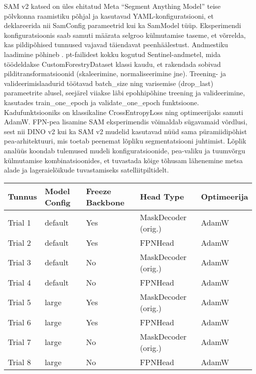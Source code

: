 SAM v2 katsed on üles ehitatud Meta ``Segment Anything Model'' teise põlvkonna
raamistiku põhjal ja kasutavad YAML-konfiguratsiooni, et deklareerida nii
SamConfig parameetrid kui ka SamModel tüüp. Eksperimendi konfiguratsioonis saab
samuti määrata selgroo külmutamise taseme, et võrrelda, kas pildipõhised
tunnused vajavad täiendavat peenhäälestust. Andmestiku laadimine põhineb .
pt-failidest kokku kogutud Sentinel-andmetel, mida töödeldakse
CustomForestryDataset klassi kaudu, et rakendada sobivad pilditransformatsioonid
(skaleerimine, normaliseerimine jne). Treening- ja valideerimislaadurid töötavad
batch\_size ning varisemise (drop\_last) parameetrite alusel, seejärel viiakse
läbi epohhipõhine treening ja valideerimine, kasutades train\_one\_epoch ja
validate\_one\_epoch funktsioone. Kadufunktsiooniks on klassikaline
CrossEntropyLoss ning optimeerijaks samuti AdamW. FPN-pea lisamine SAM
eksperimendis võimaldab sügavamaid võrdlusi, sest nii DINO v2 kui ka SAM v2
mudelid kasutavad nüüd sama püramiidipõhist pea-arhitektuuri, mis toetab
peenemat lõpliku segmentatsiooni juhtimist. Lõplik analüüs koondab tulemused
mudeli konfiguratsioonide, pea-valiku ja tuumvõrgu külmutamise
kombinatsioonides, et tuvastada kõige tõhusam lähenemine metsa alade ja
lageraielõikude tuvastamiseks satelliitpiltidelt.

\begin{table}[H]
    \caption{SAM v2 eksperimendi seadistused}
    \label{tab:samv2_experiments}
    \begin{longtable}{lllll}
        \textbf{Tunnus} & \textbf{Model Config} & \textbf{Freeze Backbone} & \textbf{Head Type} & \textbf{Optimeerija} \\
        \hline
            Trial 1 & default      & Yes                    & MaskDecoder (orig.) & AdamW \\
            Trial 2 & default      & Yes                    & FPNHead             & AdamW \\
            Trial 3 & default      & No                     & MaskDecoder (orig.) & AdamW \\
            Trial 4 & default      & No                     & FPNHead             & AdamW \\
            Trial 5 & large        & Yes                    & MaskDecoder (orig.) & AdamW \\
            Trial 6 & large        & Yes                    & FPNHead             & AdamW \\
            Trial 7 & large        & No                     & MaskDecoder (orig.) & AdamW \\
            Trial 8 & large        & No                     & FPNHead             & AdamW \\
        \hline
    \end{longtable}
\end{table}
\addtocounter{table}{-1}


